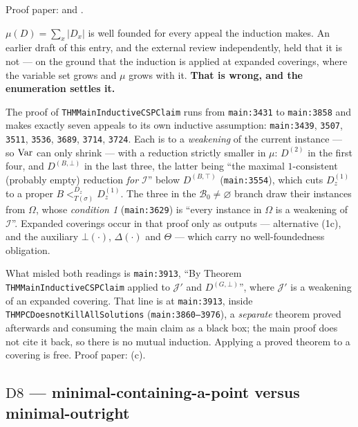 Proof paper:  and .

\begin{entry}\label{ent:measure}
$\mu(D)=\sum_{x}|D_{x}|$ is well founded for every appeal the induction makes.
An earlier draft of this entry, and the external review independently, held
that it is not --- on the ground that the induction is applied at expanded
coverings, where the variable set grows and $\mu$ grows with it. \textbf{That
is wrong, and the enumeration settles it.}

The proof of \texttt{THMMainInductiveCSPClaim} runs from \texttt{main:3431} to
\texttt{main:3858} and makes exactly seven appeals to its own inductive
assumption: \texttt{main:3439}, \texttt{3507}, \texttt{3511}, \texttt{3536},
\texttt{3689}, \texttt{3714}, \texttt{3724}. Each is to a \emph{weakening} of
the current instance --- so $\operatorname{Var}$ can only shrink --- with a reduction
strictly smaller in $\mu$: $D^{(2)}$ in the first four, and $D^{(B,\bot)}$ in
the last three, the latter being ``the maximal $1$-consistent (probably empty)
reduction \emph{for $\mathcal I$}'' below $D^{(B,\top)}$
(\texttt{main:3554}), which cuts $D^{(1)}_{z}$ to a proper
$B<^{D_{z}}_{T(\sigma)}D^{(1)}_{z}$. The three in the
$\mathcal B_{0}\neq\varnothing$ branch draw their instances from $\Omega$,
whose \emph{condition 1} (\texttt{main:3629}) is ``every instance in $\Omega$
is a weakening of $\mathcal I$''. Expanded coverings occur in that proof only
as outputs --- alternative (1c), and the auxiliary $\bot(\cdot)$,
$\Delta(\cdot)$ and $\Theta$ --- which carry no well-foundedness obligation.

What misled both readings is \texttt{main:3913}, ``By Theorem
\texttt{THMMainInductiveCSPClaim} applied to $\mathcal J'$ and
$D^{(G,\bot)}$'', where $\mathcal J'$ is a weakening of an expanded covering.
That line is at \texttt{main:3913}, inside \texttt{THMPCDoesnotKillAllSolutions}
(\texttt{main:3860--3976}), a \emph{separate} theorem proved afterwards and
consuming the main claim as a black box; the main proof does not cite it back,
so there is no mutual induction. Applying a proved theorem to a covering is
free. Proof paper: (c).
\end{entry}

\subsection{$\mathrm D8$ --- minimal-containing-a-point versus minimal-outright}
\label{sec:D8}

